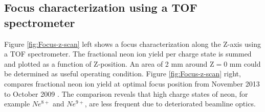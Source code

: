 \subsection{Focus characterization using a TOF spectrometer}
Figure \ref{fig:Focus-z-scan} left shows a focus characterization along the Z-axis using a TOF spectrometer. The fractional neon ion yield per charge state is summed and plotted as a function of Z-position. An area of 2 mm around $\text{Z}=0$ mm could be determined as useful operating condition. Figure \ref{fig:Focus-z-scan} right, compares fractional neon ion yield at optimal focus position from November 2013 \citep{Bucher-2016-Unpublished} to October 2009 \citep{Doumy-2011-PRL}. The comparison reveals that high charge states of neon, for example $Ne^{8+}$ and $Ne^{9+}$, are less frequent due to deteriorated beamline optics.\\
